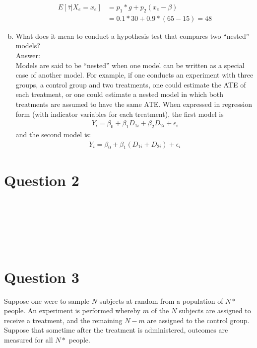 \documentclass[11pt,notitlepage]{article}\usepackage[]{graphicx}\usepackage[]{color}
\makeatletter
\newenvironment{kframe}{%
 \def\at@end@of@kframe{}%
 \ifinner\ifhmode%
  \def\at@end@of@kframe{\end{minipage}}%
  \begin{minipage}{\columnwidth}%
 \fi\fi%
 \def\FrameCommand##1{\hskip\@totalleftmargin \hskip-\fboxsep
 \colorbox{shadecolor}{##1}\hskip-\fboxsep
     \hskip-\linewidth \hskip-\@totalleftmargin \hskip\columnwidth}%
 \MakeFramed {\advance\hsize-\width
   \@totalleftmargin\z@ \linewidth\hsize
   \@setminipage}}%
 {\par\unskip\endMakeFramed%
 \at@end@of@kframe}
\newenvironment{knitrout}{}{} %
\makeatother
\begin{document}
\begin{enumerate}[a)]
\begin{align*}
E[\bar{\tau}|X_e = x_e] &= p_1*g + p_2(x_e - \beta) \\
&= 0.1 * 30 + 0.9*(65-15) = 48
\end{align*}


\item  What does it mean to conduct a hypothesis test that compares two ``nested'' models?\\
Answer:\\
Models are said to be ``nested'' when one model can be written as a special case of another model. For example, if one conducts an experiment with three groups, a control group and two treatments, one could estimate the ATE of each treatment, or one could estimate a nested model in which both treatments are assumed to have the same ATE.  When expressed in regression form (with indicator variables for each treatment), the first model is 
\begin{align*}
Y_i = \beta_0 + \beta_1 D_{1i} + \beta_2 D_{2i} + \epsilon_i
\end{align*}
and the second model is:
\begin{align*}
Y_i = \beta_0 + \beta_1 (D_{1i} + D_{2i}) + \epsilon_i
\end{align*}

\end{enumerate}


\section*{Question 2}
\begin{knitrout}
\color{fgcolor}\begin{kframe}
\begin{verbatim}






\end{verbatim}
\end{kframe}
\end{knitrout}


\section*{Question 3}
Suppose one were to sample $N$ subjects at random from a population of $N*$ people. An experiment is performed whereby $m$ of the $N$ subjects are assigned to receive a treatment, and the remaining $N - m$ are assigned to the control group. Suppose that sometime after the treatment is administered, outcomes are measured for all $N*$ people.
\end{document}
